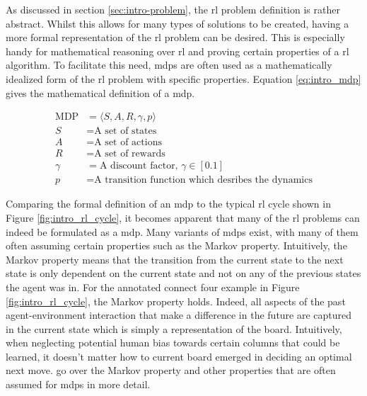 As discussed in section \ref{sec:intro-problem}, the \gls{rl} problem definition is rather abstract.
Whilst this allows for many types of solutions to be created, having a more formal representation of the \gls{rl} problem can be desired.
This is especially handy for mathematical reasoning over \gls{rl} and proving certain properties of a \gls{rl} algorithm.
To facilitate this need, \glspl{mdp} are often used as a mathematically idealized form of the \gls{rl} problem with specific properties.
Equation \ref{eq:intro_mdp} gives the mathematical definition of a \gls{mdp}.

\begin{equation}
\begin{aligned}
\text{MDP} &= \langle S, A, R, \gamma, p \rangle
\\
S &= \text{A set of states}
\\
A &= \text{A set of actions}
\\
R &= \text{A set of rewards}
\\
\gamma &= \text{A discount factor, } \gamma \in [0.1]
\\
p &= \text{A transition function which desribes the dynamics}
\end{aligned}
\label{eq:intro_mdp}
\end{equation}

Comparing the formal definition of an \gls{mdp} to the typical \gls{rl} cycle shown in Figure \ref{fig:intro_rl_cycle}, it becomes apparent that many of the \gls{rl} problems can indeed be formulated as a \gls{mdp}.
Many variants of \glspl{mdp} exist, with many of them often assuming certain properties such as the Markov property.
Intuitively, the Markov property means that the transition from the current state to the next state is only dependent on the current state and not on any of the previous states the agent was in.
For the annotated connect four example in Figure \ref{fig:intro_rl_cycle}, the Markov property holds.
Indeed, all aspects of the past agent-environment interaction that make a difference in the future are captured in the current state which is simply a representation of the board.
Intuitively, when neglecting potential human bias towards certain columns that could be learned, it doesn't matter how to current board emerged in deciding an optimal next move.
\citet{rl_intro_handbook} go over the Markov property and other properties that are often assumed for \glspl{mdp} in more detail.

